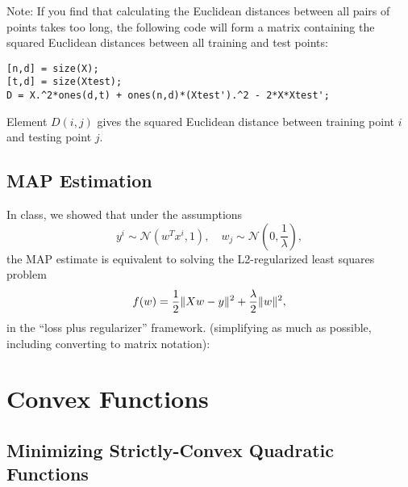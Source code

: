\documentclass{article}
\begin{document}
Note:  If you find that calculating the Euclidean distances between all pairs of points takes too long, the following code will form a matrix containing the squared Euclidean distances between all training and test points:
\begin{verbatim}
[n,d] = size(X);
[t,d] = size(Xtest);
D = X.^2*ones(d,t) + ones(n,d)*(Xtest').^2 - 2*X*Xtest';
\end{verbatim}
Element $D(i,j)$ gives the squared Euclidean distance between training point $i$ and testing point $j$.




\subsection{MAP Estimation}

In class, we showed that under the assumptions
\[
y^i \sim \mathcal{N}(w^Tx^i,1), \quad w_j \sim \mathcal{N}\left(0,\frac{1}{\lambda}\right),
\]
the MAP estimate is equivalent to solving the L2-regularized least squares problem
\[
f(w) = \frac{1}{2}\|Xw - y\|^2 + \frac \lambda 2 \|w\|^2,
\]
in the ``loss plus regularizer'' framework.
 (simplifying as much as possible, including converting to matrix notation):



\section{Convex Functions}


\subsection{Minimizing Strictly-Convex Quadratic Functions}
\end{document}
